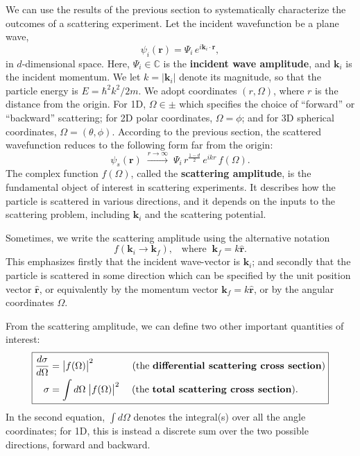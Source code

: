 \documentclass[pra,12pt]{revtex4}
\begin{document}
We can use the results of the previous section to systematically
characterize the outcomes of a scattering experiment.  Let the
incident wavefunction be a plane wave,
\begin{equation}
  \psi_i(\mathbf{r}) = \Psi_i \, e^{i\mathbf{k}_i\cdot\mathbf{r}},
\end{equation}
in $d$-dimensional space.  Here, $\Psi_i \in \mathbb{C}$ is the
\textbf{incident wave amplitude}, and $\mathbf{k}_i$ is the incident
momentum.  We let $k = |\mathbf{k}_i|$ denote its magnitude, so that
the particle energy is $E = \hbar^2k^2/2m$.  We adopt coordinates
$(r,\Omega)$, where $r$ is the distance from the origin.  For 1D,
$\Omega \in \pm$ which specifies the choice of ``forward'' or
``backward'' scattering; for 2D polar coordinates, $\Omega = \phi$;
and for 3D spherical coordinates, $\Omega = (\theta,\phi)$.  According
to the previous section, the scattered wavefunction reduces to the
following form far from the origin:
\begin{equation}
  \psi_s(\mathbf{r})\;  \overset{r\rightarrow\infty}{\longrightarrow}\; \Psi_i \, r^{\frac{1-d}{2}} \, e^{ikr} \, f(\Omega).
\end{equation}
The complex function $f(\Omega)$, called the \textbf{scattering
  amplitude}, is the fundamental object of interest in scattering
experiments.  It describes how the particle is scattered in various
directions, and it depends on the inputs to the scattering problem,
including $\mathbf{k}_i$ and the scattering potential.

Sometimes, we write the scattering amplitude using the alternative
notation
\begin{equation}
  f(\mathbf{k}_i \rightarrow \mathbf{k}_f), \;\;\;\mathrm{where}\;\; \mathbf{k}_f = k \hat{\mathbf{r}}.
\end{equation}
This emphasizes firstly that the incident wave-vector is
$\mathbf{k}_i$; and secondly that the particle is scattered in some
direction which can be specified by the unit position vector
$\hat{\mathbf{r}}$, or equivalently by the momentum vector
$\mathbf{k}_f = k \hat{\mathbf{r}}$, or by the angular coordinates
$\Omega$.

From the scattering amplitude, we can define two other important
quantities of interest:
$$\boxed{\begin{aligned}\frac{d\sigma}{d\Omega} &= \big|f(\Omega)\big|^2 \qquad\quad\quad \text{(the \textbf{differential scattering cross section})} \\ \sigma &= \int d\Omega\; \big|f(\Omega)\big|^2 \quad\; \text{(the \textbf{total scattering cross section}).}
  \end{aligned}}$$
In the second equation, $\int d\Omega$ denotes the integral(s) over
all the angle coordinates; for 1D, this is instead a discrete sum over
the two possible directions, forward and backward.
\end{document}
